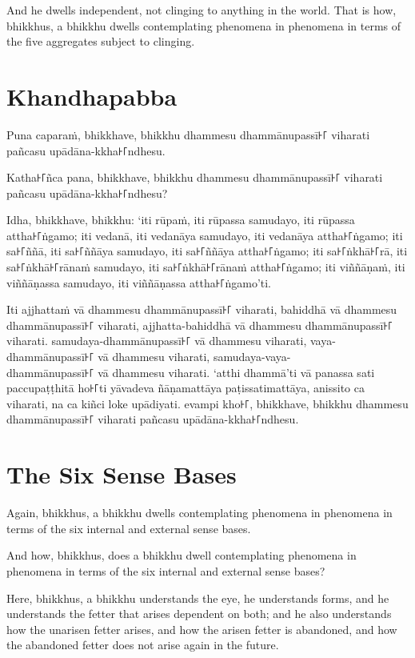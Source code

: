 And he dwells independent, not clinging to anything in the world. That is how,
bhikkhus, a bhikkhu dwells contemplating phenomena in phenomena in terms of the
five aggregates subject to clinging.


\paliPage
\section*{Khandhapabba}

Puna caparaṁ, bhikkhave, bhikkhu dhammesu dhammānupassī꜔꜒ viharati pañcasu
upādāna-kkha꜔꜒ndhesu.

Katha꜔꜒ñca pana, bhikkhave, bhikkhu dhammesu dhammānupassī꜔꜒ viharati pañcasu
upādāna-kkha꜔꜒ndhesu?

Idha, bhikkhave, bhikkhu:
‘iti rūpaṁ, iti rūpassa samudayo, iti rūpassa attha꜔꜒ṅgamo;
iti vedanā, iti vedanāya samudayo, iti vedanāya attha꜔꜒ṅgamo;
iti sa꜔꜒ññā, iti sa꜔꜒ññāya samudayo, iti sa꜔꜒ññāya attha꜔꜒ṅgamo;
iti sa꜔꜒ṅkhā꜔꜒rā, iti sa꜔꜒ṅkhā꜔꜒rānaṁ samudayo, iti sa꜔꜒ṅkhā꜔꜒rānaṁ attha꜔꜒ṅgamo;
iti viññāṇaṁ, iti viññāṇassa samudayo, iti viññāṇassa attha꜔꜒ṅgamo’ti.

Iti ajjhattaṁ vā dhammesu dhammānupassī꜔꜒ viharati,
bahiddhā vā dhammesu dhammānupassī꜔꜒ viharati,
ajjhatta-bahiddhā vā dhammesu dhammānupassī꜔꜒ viharati.
samudaya-dhammānupassī꜔꜒ vā dhammesu viharati,
vaya-dhammānupassī꜔꜒ vā dhammesu viharati,
samudaya-vaya-\\ dhammānupassī꜔꜒ vā dhammesu viharati.
‘atthi dhammā’ti vā panassa sati paccupaṭṭhitā ho꜔꜒ti
yāvadeva ñāṇamattāya paṭissatimattāya, anissito ca viharati,
na ca kiñci loke upādiyati. evampi kho꜔꜒, bhikkhave, bhikkhu
dhammesu dhammānupassī꜔꜒ viharati pañcasu upādāna-kkha꜔꜒ndhesu.


\englishPage
\section{The Six Sense Bases}

Again, bhikkhus, a bhikkhu dwells contemplating phenomena in phenomena in terms
of the six internal and external sense bases.

And how, bhikkhus, does a bhikkhu dwell contemplating phenomena in phenomena in
terms of the six internal and external sense bases?

Here, bhikkhus, a bhikkhu understands the eye, he understands forms, and he
understands the fetter that arises dependent on both; and he also understands
how the unarisen fetter arises, and how the arisen fetter is abandoned, and how
the abandoned fetter does not arise again in the future.

